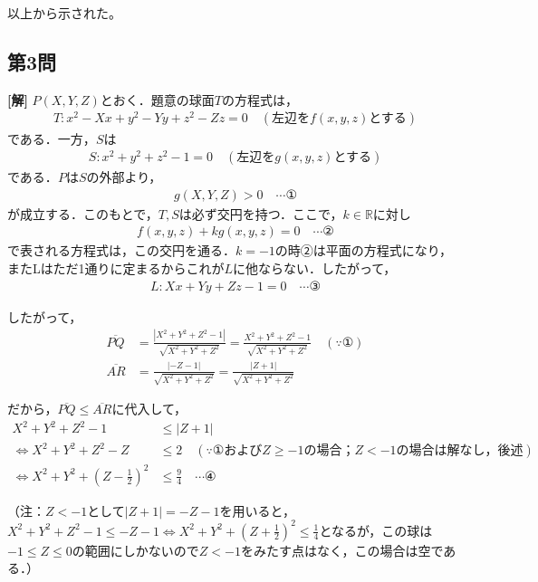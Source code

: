\documentclass[../main.tex]{subfiles}
\begin{document}
\noindent
以上から示された。 \hfill {}

\bigskip

\subsection*{第3問}

\noindent
{\bf [解]}
$P(X,Y,Z)$とおく．題意の球面$T$の方程式は，
\begin{align*}
  T:x^2-Xx+y^2-Yy+z^2-Zz=0\quad(\text{左辺を}f(x,y,z)\text{とする})
\end{align*}
である．一方，$S$は
\begin{align*}
  S:x^2+y^2+z^2-1=0\quad(\text{左辺を}g(x,y,z)\text{とする})
\end{align*}
である．$P$は$S$の外部より，
\begin{align*}
  g(X,Y,Z)>0\quad\cdots①
\end{align*}
が成立する．このもとで，$T,S$は必ず交円を持つ．ここで，$k\in\mathbb R$に対し
\begin{align*}
  f(x,y,z)+kg(x,y,z)=0\quad\cdots②
\end{align*}
で表される方程式は，この交円を通る．$k=-1$の時②は平面の方程式になり，またLはただ1通りに定まるからこれが$L$に他ならない．したがって，
\begin{align*}
  L:Xx+Yy+Zz-1=0\quad\cdots③
\end{align*}

したがって，
\begin{align*}
  \overline{PQ}&=\frac{|X^2+Y^2+Z^2-1|}{\sqrt{X^2+Y^2+Z^2}}=\frac{X^2+Y^2+Z^2-1}{\sqrt{X^2+Y^2+Z^2}}\quad(\because①)\\
  \overline{AR}&=\frac{|{-Z-1}|}{\sqrt{X^2+Y^2+Z^2}}=\frac{|Z+1|}{\sqrt{X^2+Y^2+Z^2}}
\end{align*}

だから，$\overline{PQ}\le\overline{AR}$に代入して，
\begin{align*}
  X^2+Y^2+Z^2-1&\le|Z+1|\\
  \iff X^2+Y^2+Z^2-Z&\le2\quad(\because①\text{および}Z\ge-1\text{の場合；}Z<-1\text{の場合は解なし，後述})\\
  \iff X^2+Y^2+\left(Z-\frac12\right)^2&\le\frac94\quad\cdots④
\end{align*}

（注：$Z<-1$として$|Z+1|=-Z-1$を用いると，$X^2+Y^2+Z^2-1\le-Z-1\iff X^2+Y^2+\left(Z+\frac12\right)^2\le\frac14$となるが，この球は$-1\le Z\le0$の範囲にしかないので$Z<-1$をみたす点はなく，この場合は空である．）
\end{document}
